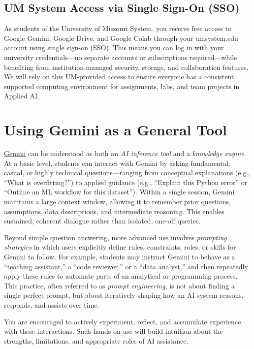 \documentclass[12pt]{article}
\begin{document}
\subsection*{UM System Access via Single Sign-On (SSO)}
As students of the University of Missouri System, you receive free access to Google Gemini, Google Drive, and Google Colab through your umsystem.edu account using single sign-on (SSO). This means you can log in with your university credentials—no separate accounts or subscriptions required—while benefiting from institution-managed security, storage, and collaboration features. We will rely on this UM-provided access to ensure everyone has a consistent, supported computing environment for assignments, labs, and team projects in Applied AI.

\section*{Using Gemini as a General Tool}

\href{https://gemini.google.com/app}{Gemini} can be understood as both an \emph{AI inference tool} and a \emph{knowledge engine}. At a basic level, students can interact with Gemini by asking fundamental, casual, or highly technical questions—ranging from conceptual explanations (e.g., ``What is overfitting?'') to applied guidance (e.g., ``Explain this Python error'' or ``Outline an ML workflow for this dataset''). Within a single session, Gemini maintains a large context window, allowing it to remember prior questions, assumptions, data descriptions, and intermediate reasoning. This enables sustained, coherent dialogue rather than isolated, one-off queries.

Beyond simple question answering, more advanced use involves \emph{prompting strategies} in which users explicitly define rules, constraints, roles, or skills for Gemini to follow. For example, students may instruct Gemini to behave as a ``teaching assistant,'' a ``code reviewer,'' or a ``data analyst,'' and then repeatedly apply these rules to automate parts of an analytical or programming process. This practice, often referred to as \emph{prompt engineering}, is not about finding a single perfect prompt, but about iteratively shaping how an AI system reasons, responds, and assists over time.

You are encouraged to actively experiment, reflect, and accumulate experience with these interactions. Such hands-on use will build intuition about the strengths, limitations, and appropriate roles of AI assistance. 
\end{document}
